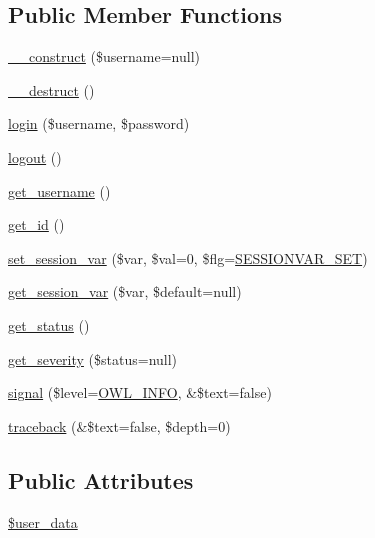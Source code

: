 \subsection*{Public Member Functions}
\begin{DoxyCompactItemize}
\item 
\hyperlink{classUser_ab8a717f17626301cc8b7815a43ea5b5b}{\_\-\_\-construct} (\$username=null)
\item 
\hyperlink{classUser_accd20149a7414612c1505e022eb63ffc}{\_\-\_\-destruct} ()
\item 
\hyperlink{classUser_a2c4fae5935ebf84e787126795bf42988}{login} (\$username, \$password)
\item 
\hyperlink{classUser_a06ed977c877b02b420233d4f18a6a668}{logout} ()
\item 
\hyperlink{classUser_a1348ddf190d4df2518665fb51305a902}{get\_\-username} ()
\item 
\hyperlink{classUser_a21bee530c9f8304e9e74e274f0f655af}{get\_\-id} ()
\item 
\hyperlink{classUser_a80108765c46ddec1ab776a774ae07f53}{set\_\-session\_\-var} (\$var, \$val=0, \$flg=\hyperlink{class_8sessionhandler_8php_af9e860b1663497a46177b0ec35d6a9f5}{SESSIONVAR\_\-SET})
\item 
\hyperlink{classUser_a84f3693077e777cc1d61b45fcecdb36c}{get\_\-session\_\-var} (\$var, \$default=null)
\item 
\hyperlink{class__OWL_a99ec771fa2c5c279f80152cc09e489a8}{get\_\-status} ()
\item 
\hyperlink{class__OWL_adf9509ef96858be7bdd9414c5ef129aa}{get\_\-severity} (\$status=null)
\item 
\hyperlink{class__OWL_a51ba4a16409acf2a2f61f286939091a5}{signal} (\$level=\hyperlink{owl_8severitycodes_8php_a139328861128689f2f4def6a399d9057}{OWL\_\-INFO}, \&\$text=false)
\item 
\hyperlink{class__OWL_aa29547995d6741b7d2b90c1d4ea99a13}{traceback} (\&\$text=false, \$depth=0)
\end{DoxyCompactItemize}
\subsection*{Public Attributes}
\begin{DoxyCompactItemize}
\item 
\hyperlink{classUserHandler_ae7a2d59eee65560ac96b860e828bb445}{\$user\_\-data}
\end{DoxyCompactItemize}
